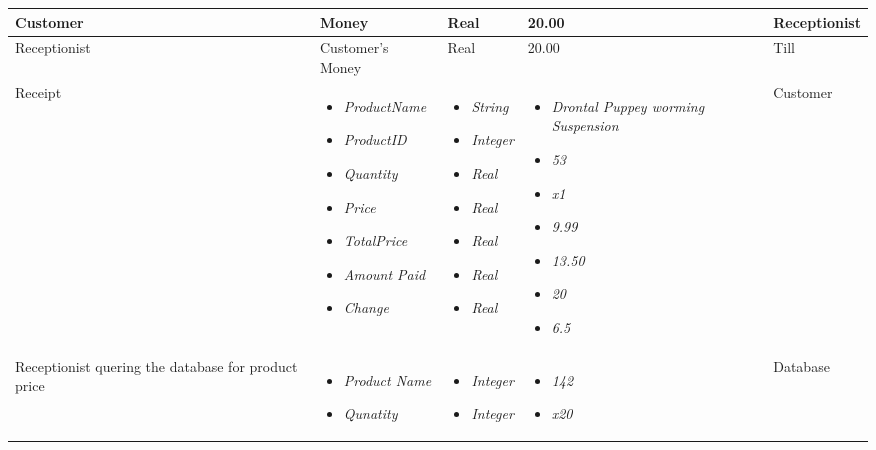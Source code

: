 \begin{center}
\begin{tabular}{|p{2cm}|p{3cm}|p{2cm}|p{3cm}|p{3cm}|}
	Customer & Money & Real & 20.00 & Receptionist \\ \hline
	Receptionist & Customer's Money & Real & 20.00 & Till \\ \hline
	Receipt
	 & \begin{itemize}
        		\item \textit{ProductName	}
        		\item  \textit{ProductID}
        		\item \textit{Quantity}
        		\item  \textit{Price}
        		\item \textit{TotalPrice}
        		\item  \textit{Amount Paid}
        		\item \textit{Change}
	\end{itemize}
	& \begin{itemize}
        		\item \textit{String}
        		\item  \textit{Integer}
        		\item \textit{Real}
        		\item  \textit{Real}
        		\item \textit{Real}
        		\item  \textit{Real}
        		\item \textit{Real}
	\end{itemize}
         & \begin{itemize}
        		\item \textit{Drontal Puppey worming Suspension}
        		\item  \textit{53}
        		\item \textit{x1}
        		\item  \textit{9.99}
        		\item \textit{13.50}
        		\item  \textit{20}
        		\item \textit{6.5}
	\end{itemize}
	& Customer \\ \hline
	Receptionist quering the database for product price
         & \begin{itemize}
        		\item \textit{Product Name}
        		\item  \textit{Qunatity}
	\end{itemize}
	& \begin{itemize}
        		\item \textit{Integer}
        		\item  \textit{Integer}
	\end{itemize}
         & \begin{itemize}
        		\item \textit{142}
        		\item  \textit{x20}
        	\end{itemize}
        & Database \\ \hline
  \end{tabular}
\end{center}


